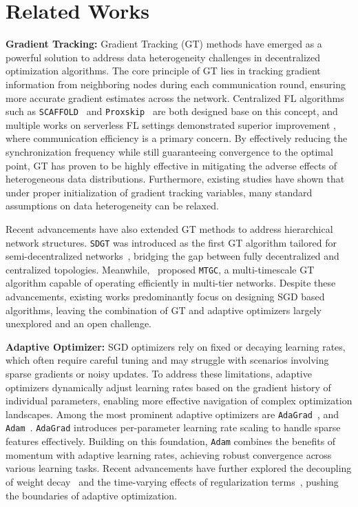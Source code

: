 \section{Related Works}
\textbf{Gradient Tracking:} Gradient Tracking (GT) methods \cite{di2016next,nedic2017achieving,tian2018asy,koloskova2021improved,carnevale2022gtadam,takezawa2022momentum,wang2024momentum} have emerged as a powerful solution to address data heterogeneity challenges in decentralized optimization algorithms. The core principle of GT lies in tracking gradient information from neighboring nodes during each communication round, ensuring more accurate gradient estimates across the network. Centralized FL algorithms such as {\tt SCAFFOLD}~\cite{karimireddy2020scaffold} and {\tt Proxskip}~\cite{mishchenko2022proxskip} are both designed base on this concept, and multiple works on serverless FL settings demonstrated superior improvement \cite{liu2023decentralized,ge2023gradient,berahas2023balancing,alghunaim2024local}, where communication efficiency is a primary concern. By effectively reducing the synchronization frequency while still guaranteeing convergence to the optimal point, GT has proven to be highly effective in mitigating the adverse effects of heterogeneous data distributions. Furthermore, existing studies have shown that under proper initialization of gradient tracking variables, many standard assumptions on data heterogeneity can be relaxed.

Recent advancements have also extended GT methods to address hierarchical network structures. {\tt SDGT} was introduced as the first GT algorithm tailored for semi-decentralized networks~\cite{chen2024taming}, bridging the gap between fully decentralized and centralized topologies. Meanwhile,~\cite{fang2024hierarchical} proposed {\tt MTGC}, a multi-timescale GT algorithm capable of operating efficiently in multi-tier networks. 
Despite these advancements, existing works predominantly focus on designing SGD based algorithms, leaving the combination of GT and adaptive optimizers largely unexplored and an open challenge.

\textbf{Adaptive Optimizer:} SGD optimizers rely on fixed or decaying learning rates, which often require careful tuning and may struggle with scenarios involving sparse gradients or noisy updates. To address these limitations, adaptive optimizers dynamically adjust learning rates based on the gradient history of individual parameters, enabling more effective navigation of complex optimization landscapes. Among the most prominent adaptive optimizers are {\tt AdaGrad}~\cite{duchi2011adaptive}, and {\tt Adam}~\cite{kingma2014adam}. {\tt AdaGrad} introduces per-parameter learning rate scaling to handle sparse features effectively. Building on this foundation, {\tt Adam} combines the benefits of momentum with adaptive learning rates, achieving robust convergence across various learning tasks. Recent advancements have further explored the decoupling of weight decay~\cite{loshchilov2017decoupled} and the time-varying effects of regularization terms~\cite{xie2024overlooked}, pushing the boundaries of adaptive optimization.

